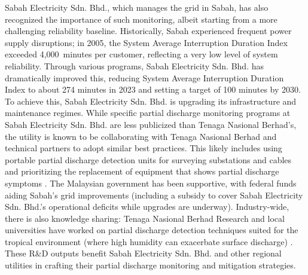 Sabah Electricity Sdn. Bhd., which manages the grid in Sabah, has also recognized the importance of such monitoring, albeit starting from a more challenging reliability baseline. Historically, Sabah experienced frequent power supply disruptions; in 2005, the System Average Interruption Duration Index exceeded 4{,}000~minutes per customer, reflecting a very low level of system reliability. Through various programs, Sabah Electricity Sdn. Bhd. has dramatically improved this, reducing System Average Interruption Duration Index to about 274 minutes in 2023 and setting a target of 100 minutes by 2030. To achieve this, Sabah Electricity Sdn. Bhd. is upgrading its infrastructure and maintenance regimes. While specific partial discharge monitoring programs at Sabah Electricity Sdn. Bhd. are less publicized than Tenaga Nasional Berhad's, the utility is known to be collaborating with Tenaga Nasional Berhad and technical partners to adopt similar best practices. This likely includes using portable partial discharge detection units for surveying substations and cables and prioritizing the replacement of equipment that shows partial discharge symptoms \parencite{Sikorski_2025}. The Malaysian government has been supportive, with federal funds aiding Sabah's grid improvements (including a subsidy to cover Sabah Electricity Sdn. Bhd.'s operational deficits while upgrades are underway). Industry-wide, there is also knowledge sharing: Tenaga Nasional Berhad Research and local universities have worked on partial discharge detection techniques suited for the tropical environment (where high humidity can exacerbate surface discharge) \parencite{Azam_2023}. These R&D outputs benefit Sabah Electricity Sdn. Bhd. and other regional utilities in crafting their partial discharge monitoring and mitigation strategies.


